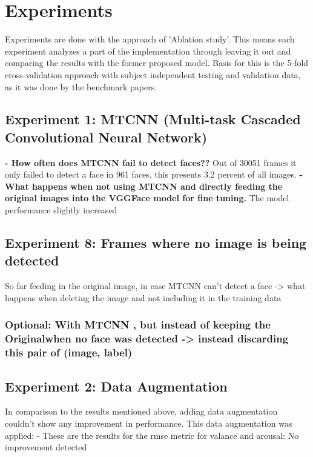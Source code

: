\section{Experiments}
Experiments are done with the approach of 'Ablation study'. This means each experiment analyzes a part of the implementation through leaving it out and comparing the results with the former proposed model.\newline
Basis for this is the 5-fold cross-validation approach with subject independent testing and validation data, as it was done by the benchmark papers.

\subsection{Experiment 1: MTCNN (Multi-task Cascaded Convolutional Neural Network)}
\textbf{- How often does MTCNN fail to detect faces??}\newline
Out of 30051 frames it only failed to detect a face in 961 faces, this presents 3.2 percent of all images.
\newline\newline
\textbf{- What happens when not using MTCNN and directly feeding the original images into the VGGFace model for fine tuning.}\newline
The model performance slightly increased

\subsection{Experiment 8: Frames where no image is being detected}
So far feeding in the original image, in case MTCNN can't detect a face
-> what happens when deleting the image and not including it in the training data

\subsubsection{Optional: With MTCNN , but instead of keeping the Originalwhen no face was detected -> instead discarding this pair of (image, label)}

\subsection{Experiment 2: Data Augmentation}
 In comparison to the results mentioned above, adding data augmentation couldn't show any improvement in performance.
\newline\newline
This data augmentation was applied:
-
\newline\newline
These are the results for the rmse metric for valance and arousal:
No improvement detected

